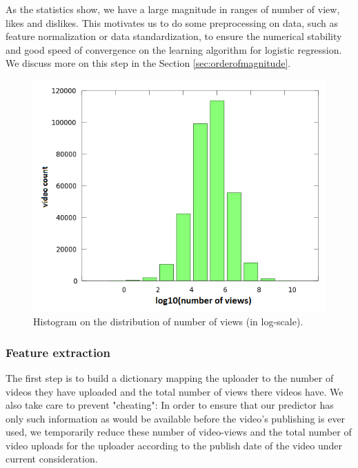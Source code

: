 		As the statistics show, we have a large magnitude in ranges of number of view, likes and dislikes. This motivates us to do some preprocessing on data, such as feature normalization or data standardization, to ensure the numerical stability and good speed of convergence on the learning algorithm for logistic regression. We discuss more on this step in the Section \ref{sec:orderofmagnitude}.
		
		\begin{figure}[!h]
			\begin{center}
				\includegraphics[width=.75\textwidth,clip]{DistributionOfViews.png}
			\end{center}
			\caption{Histogram on the distribution of number of views (in log-scale).}
			\label{fig:logNoOfViews}
		\end{figure}
				
	\subsubsection{Feature extraction}
		The first step is to build a dictionary mapping the uploader to the number of videos they have uploaded and the total number of views there videos have. We also take care to prevent "cheating":  In order to ensure that our predictor has only such information as would be available before the video's publishing is ever used, we temporarily reduce these number of video-views and the total number of video uploads for the uploader according to the publish date of the video under current consideration.

